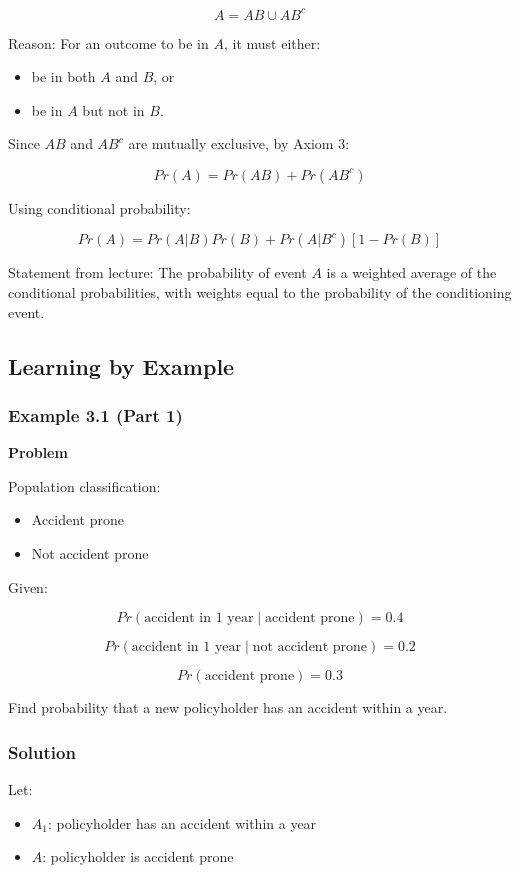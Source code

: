 \documentclass[12pt]{article}
\begin{document}
\[
A = AB \cup AB^c
\]

Reason: For an outcome to be in $A$, it must either:
\begin{itemize}
\item be in both $A$ and $B$, or
\item be in $A$ but not in $B$.
\end{itemize}

Since $AB$ and $AB^c$ are mutually exclusive, by Axiom 3:

\[
Pr(A) = Pr(AB) + Pr(AB^c)
\]

Using conditional probability:

\[
Pr(A) = Pr(A|B)Pr(B) + Pr(A|B^c)[1 - Pr(B)]
\]

Statement from lecture:  
The probability of event $A$ is a weighted average of the conditional probabilities, with weights equal to the probability of the conditioning event.

\subsection{Learning by Example}

\subsubsection*{Example 3.1 (Part 1)}

\textbf{Problem}

Population classification:
\begin{itemize}
\item Accident prone
\item Not accident prone
\end{itemize}

Given:

\[
Pr(\text{accident in 1 year} \mid \text{accident prone}) = 0.4
\]

\[
Pr(\text{accident in 1 year} \mid \text{not accident prone}) = 0.2
\]

\[
Pr(\text{accident prone}) = 0.3
\]

Find probability that a new policyholder has an accident within a year.

\subsubsection*{Solution}

Let:
\begin{itemize}
\item $A_1$: policyholder has an accident within a year
\item $A$: policyholder is accident prone
\end{itemize}
\end{document}

